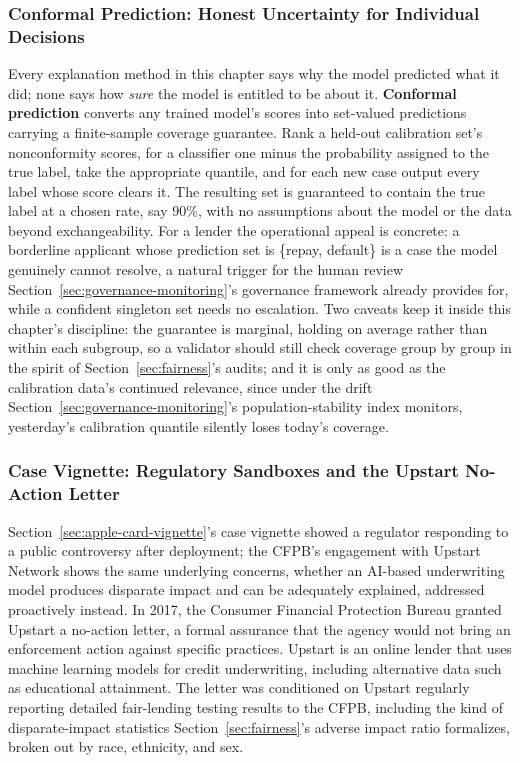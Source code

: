 \documentclass[../ai_in_finance]{subfiles}
\begin{document}
\subsubsection*{Conformal Prediction: Honest Uncertainty for Individual Decisions}

Every explanation method in this chapter says why the model predicted what it did; none says how \emph{sure} the model is entitled to be about it. \textbf{Conformal prediction} converts any trained model's scores into set-valued predictions carrying a finite-sample coverage guarantee. Rank a held-out calibration set's nonconformity scores, for a classifier one minus the probability assigned to the true label, take the appropriate quantile, and for each new case output every label whose score clears it. The resulting set is guaranteed to contain the true label at a chosen rate, say 90\%, with no assumptions about the model or the data beyond exchangeability. For a lender the operational appeal is concrete: a borderline applicant whose prediction set is \{repay, default\} is a case the model genuinely cannot resolve, a natural trigger for the human review Section~\ref{sec:governance-monitoring}'s governance framework already provides for, while a confident singleton set needs no escalation. Two caveats keep it inside this chapter's discipline: the guarantee is marginal, holding on average rather than within each subgroup, so a validator should still check coverage group by group in the spirit of Section~\ref{sec:fairness}'s audits; and it is only as good as the calibration data's continued relevance, since under the drift Section~\ref{sec:governance-monitoring}'s population-stability index monitors, yesterday's calibration quantile silently loses today's coverage.

\subsubsection*{Case Vignette: Regulatory Sandboxes and the Upstart No-Action Letter}

Section~\ref{sec:apple-card-vignette}'s case vignette showed a regulator responding to a public controversy after deployment; the CFPB's engagement with Upstart Network shows the same underlying concerns, whether an AI-based underwriting model produces disparate impact and can be adequately explained, addressed proactively instead. In 2017, the Consumer Financial Protection Bureau granted Upstart a no-action letter, a formal assurance that the agency would not bring an enforcement action against specific practices. Upstart is an online lender that uses machine learning models for credit underwriting, including alternative data such as educational attainment. The letter was conditioned on Upstart regularly reporting detailed fair-lending testing results to the CFPB, including the kind of disparate-impact statistics Section~\ref{sec:fairness}'s adverse impact ratio formalizes, broken out by race, ethnicity, and sex.
\end{document}
